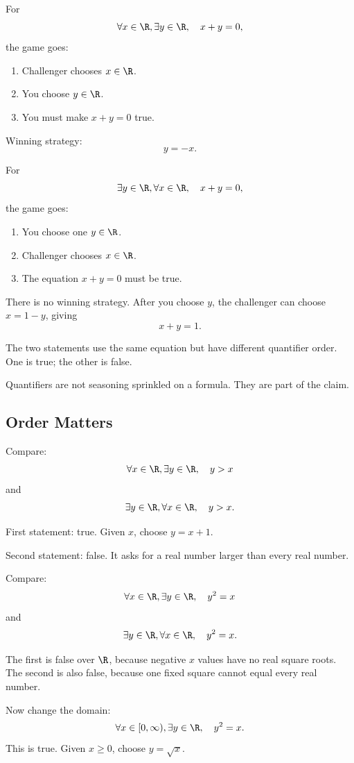 For
\[
\forall x\in\R,\exists y\in\R,\quad x+y=0,
\]
the game goes:

\begin{enumerate}
\item Challenger chooses $x\in\R$.
\item You choose $y\in\R$.
\item You must make $x+y=0$ true.
\end{enumerate}

Winning strategy:
\[
y=-x.
\]

For
\[
\exists y\in\R,\forall x\in\R,\quad x+y=0,
\]
the game goes:

\begin{enumerate}
\item You choose one $y\in\R$.
\item Challenger chooses $x\in\R$.
\item The equation $x+y=0$ must be true.
\end{enumerate}

There is no winning strategy. After you choose $y$, the challenger can choose $x=1-y$, giving
\[
x+y=1.
\]

The two statements use the same equation but have different quantifier order. One is true; the other is false.

\begin{intuitionbox}
Quantifiers are not seasoning sprinkled on a formula. They are part of the claim.
\end{intuitionbox}

\subsection{Order Matters}

Compare:
\[
\forall x\in\R,\exists y\in\R,\quad y>x
\]
and
\[
\exists y\in\R,\forall x\in\R,\quad y>x.
\]

First statement: true. Given $x$, choose $y=x+1$.

Second statement: false. It asks for a real number larger than every real number.

Compare:
\[
\forall x\in\R,\exists y\in\R,\quad y^2=x
\]
and
\[
\exists y\in\R,\forall x\in\R,\quad y^2=x.
\]

The first is false over $\R$, because negative $x$ values have no real square roots. The second is also false, because one fixed square cannot equal every real number.

Now change the domain:
\[
\forall x\in[0,\infty),\exists y\in\R,\quad y^2=x.
\]
This is true. Given $x\geq0$, choose $y=\sqrt{x}$.


